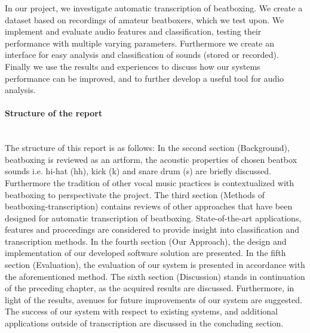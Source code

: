 In our project, we investigate automatic transcription of beatboxing. We create a dataset based on recordings of amateur beatboxers, which we test upon. We implement and evaluate audio features and classification, testing their performance with multiple varying parameters.
Furthermore we create an interface for easy analysis and classification of sounds (stored or recorded). Finally we use the results and experiences to discuss how our systems performance can be improved, and to further develop a useful tool for audio analysis.


\paragraph{Structure of the report}\hspace{0pt}\\
The structure of this report is as follows: In the second section (Background), beatboxing is reviewed as an artform, the acoustic properties of chosen beatbox sounds i.e. hi-hat (hh), kick (k) and snare drum (s) are briefly discussed. Furthermore the tradition of other vocal music practices is contextualized with beatboxing to perspectivate the project. The third section (Methods of beatboxing-transcription) contains reviews of other approaches that have been designed for automatic transcription of beatboxing. State-of-the-art applications, features and proceedings are considered to provide insight into classification and transcription methods. In the fourth section (Our Approach), the design and implementation of our developed software solution are presented. In the fifth section (Evaluation), the evaluation of our system is presented in accordance with the aforementioned method. The sixth section (Discussion) stands in continuation of the preceding chapter, as the acquired results are discussed. Furthermore, in light of the results, avenues for future improvements of our system are suggested. The success of our system with respect to existing systems, and additional applications outside of transcription are discussed in the concluding section.